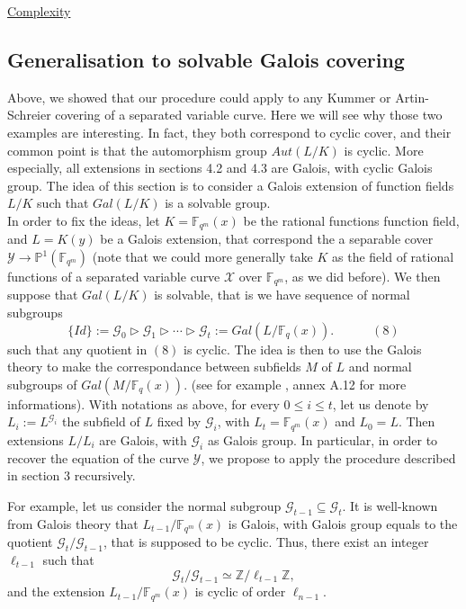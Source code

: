 \documentclass[10pt]{article}
\newcommand{\s}{\vspace{0.3cm}}
\newcommand{\Z}{\mathbb{Z}}
\newcommand{\fqm}{\mathbb{F}_{q^m}}
\newcommand{\fq}{\mathbb{F}_q}
\newcommand{\su}{\subseteq}
\newcommand{\X}{\mathcal{X}}
\newcommand{\Y}{\mathcal{Y}}
\newcommand{\G}{\mathcal{G}}
\begin{document}
\s

\underline{Complexity}

\s

\subsection{Generalisation to solvable Galois covering}

\s

Above, we showed that our procedure could apply to any Kummer or Artin-Schreier covering of a separated variable curve. Here we will see why those two examples are interesting. In fact, they both correspond to cyclic cover, and their common point is that the automorphism group $Aut(L/K)$ is cyclic. More especially, all extensions in sections 4.2 and 4.3 are Galois, with cyclic Galois group. The idea of this section is to consider a Galois extension of function fields $L/K$ such that $Gal(L/K)$ is a solvable group. \\
In order to fix the ideas, let $K=\fqm(x)$ be the rational functions function field, and $L=K(y)$ be a Galois extension, that correspond the a separable cover $\Y \rightarrow \mathbb{P}^1(\fqm)$ (note that we could more generally take $K$ as the field of rational functions of a separated variable curve $\X$ over $\fqm$, as we did before). We then suppose that $Gal(L/K)$ is solvable, that is we have sequence of normal subgroups
\[ \{Id\} := \G_0 \triangleright \G_1 \triangleright \cdots \triangleright \G_t := Gal(L/\fq(x)). \quad \quad \quad (8)\]
such that any quotient in $(8)$ is cyclic.
The idea is then to use the Galois theory to make the correspondance between subfields $M$ of $L$ and normal subgroups of $Gal(M/\fq(x))$. (see for example \cite{Sti}, annex A.12 for more informations). 
With notations as above, for every $0 \leq i \leq t$, let us denote by $L_i := L^{\G_i}$ the subfield of $L$ fixed by $\G_i$, with $L_t=\fqm(x)$ and $L_0=L$. Then  extensions $L/L_i$ are Galois, with $\G_i$ as Galois group. In particular, in order to recover the equation of the curve $\Y$, we propose to apply the procedure described in section 3 recursively. 

 \s
 
For example, let us consider the normal subgroup $\G_{t-1} \su \G_t$. It is well-known from Galois theory that $L_{t-1}/\fqm(x)$ is Galois, with Galois group equals to the quotient $\G_t/\G_{t-1}$, that is supposed to be cyclic. Thus, there exist an integer $\ell_{t-1}$ such that 
\[ \G_t/\G_{t-1} \simeq \Z/\ell_{t-1}\Z,\] 
and the extension $L_{t-1}/\fqm(x)$ is cyclic of order $\ell_{n-1}$. 
\end{document}
